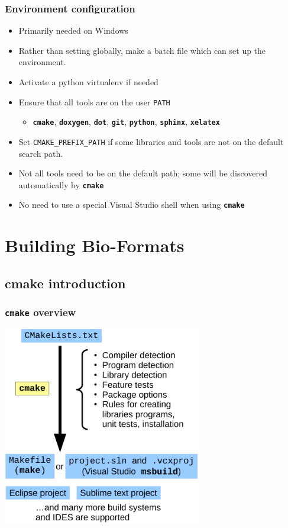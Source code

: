 \documentclass{beamer}
\newcommand{\cmd}[1]{\textbf{\texttt{#1}}}
\begin{document}
\begin{frame}
  \frametitle{Environment configuration}
  \begin{itemize}
    \item Primarily needed on Windows
    \item Rather than setting globally, make a batch file which can set up the environment.
    \item Activate a python virtualenv if needed
    \item Ensure that all tools are on the user \texttt{PATH}
      \begin{itemize}
        \item \cmd{cmake}, \cmd{doxygen}, \cmd{dot}, \cmd{git}, \cmd{python}, \cmd{sphinx}, \cmd{xelatex}
      \end{itemize}
    \item Set \texttt{CMAKE\_PREFIX\_PATH} if some libraries and tools are not on the default search path.
    \item Not all tools need to be on the default path; some will be discovered automatically by \cmd{cmake}
    \item No need to use a special Visual Studio shell when using \cmd{cmake}
  \end{itemize}
\end{frame}

\section{Building Bio-Formats}

\subsection{cmake introduction}

\begin{frame}
  \frametitle{\cmd{cmake} overview}
  \medskip
  \centering
  \includegraphics[width=0.65\textwidth]{cmake-flow}
\end{frame}
\end{document}
